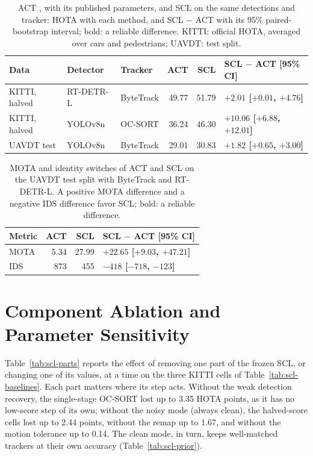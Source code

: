 \begin{table}[tbp]
\centering
\caption{ACT \cite{act2026adaptive}, with its published parameters, and SCL on the same detections and tracker: HOTA with each method, and SCL $-$ ACT with its 95\% paired-bootstrap interval; bold: a reliable difference. KITTI: official HOTA, averaged over cars and pedestrians; UAVDT: test split.}
\label{tab:scl-act}
\begin{tabular}{lllrrl}
\toprule
Data & Detector & Tracker & ACT & SCL & SCL $-$ ACT [95\% CI]\\
\midrule
KITTI, halved & RT-DETR-L & ByteTrack & 49.77 & 51.79 & \textbf{$+2.01$ [$+0.01$, $+4.76$]}\\
KITTI, halved & YOLOv8n & OC-SORT & 36.24 & 46.30 & \textbf{$+10.06$ [$+6.88$, $+12.01$]}\\
UAVDT test & YOLOv8n & ByteTrack & 29.01 & 30.83 & \textbf{$+1.82$ [$+0.65$, $+3.00$]}\\
\bottomrule
\end{tabular}
\end{table}

\begin{table}[tbp]
\centering
\caption{MOTA and identity switches of ACT and SCL on the UAVDT test split with ByteTrack and RT-DETR-L. A positive MOTA difference and a negative IDS difference favor SCL; bold: a reliable difference.}
\label{tab:scl-act-uavdt}
\begin{tabular}{lrrl}
\toprule
Metric & ACT & SCL & SCL $-$ ACT [95\% CI]\\
\midrule
MOTA & 5.34 & 27.99 & \textbf{$+22.65$ [$+9.03$, $+47.21$]}\\
IDS & 873 & 455 & \textbf{$-418$ [$-718$, $-123$]}\\
\bottomrule
\end{tabular}
\end{table}

\section{Component Ablation and Parameter Sensitivity}\label{sec:scl-ablation}
Table~\ref{tab:scl-parts} reports the effect of removing one part of the frozen SCL, or changing one of its values, at a time on the three KITTI cells of Table~\ref{tab:scl-baselines}. Each part matters where its step acts. Without the weak detection recovery, the single-stage OC-SORT lost up to 3.35 HOTA points, as it has no low-score step of its own; without the noisy mode (always clean), the halved-score cells lost up to 2.44 points, without the remap up to 1.67, and without the motion tolerance up to 0.14. The clean mode, in turn, keeps well-matched trackers at their own accuracy (Table~\ref{tab:scl-prior}).

